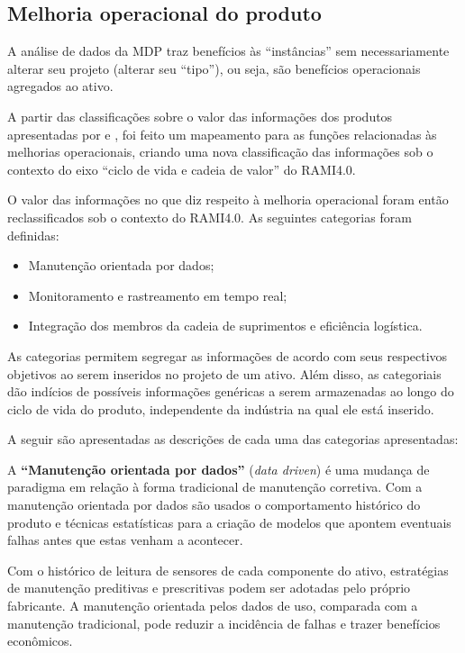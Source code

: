 \subsection{Melhoria operacional do produto}
\label{sec:melhoria-operacional}

A análise de dados da MDP traz benefícios às ``instâncias'' sem necessariamente alterar seu projeto (alterar seu ``tipo''), ou seja, são benefícios operacionais agregados ao ativo.

A partir das classificações sobre o valor das informações dos produtos apresentadas por  e , foi feito um mapeamento para as funções relacionadas às melhorias operacionais, criando uma nova classificação das informações sob o contexto do eixo ``ciclo de vida e cadeia de valor'' do RAMI4.0.

O valor das informações no que diz respeito à melhoria operacional foram então reclassificados sob o contexto do RAMI4.0. As seguintes categorias foram definidas:

\begin{itemize}
	\item Manutenção orientada por dados;
	\item Monitoramento e rastreamento em tempo real;
	\item Integração dos membros da cadeia de suprimentos e eficiência logística.
\end{itemize}

As categorias permitem segregar as informações de acordo com seus respectivos objetivos ao serem inseridos no projeto de um ativo. Além disso, as categoriais dão indícios de possíveis informações genéricas a serem armazenadas ao longo do ciclo de vida do produto, independente da indústria na qual ele está inserido.

A seguir são apresentadas as descrições de cada uma das categorias apresentadas:

A \textbf{``Manutenção orientada por dados''} (\textit{data driven}) é uma mudança de paradigma em relação à forma tradicional de manutenção corretiva. Com a manutenção orientada por dados são usados o comportamento histórico do produto e técnicas estatísticas para a criação de modelos que apontem eventuais falhas antes que estas venham a acontecer.

Com o histórico de leitura de sensores de cada componente do ativo, estratégias de manutenção preditivas e prescritivas podem ser adotadas pelo próprio fabricante. A manutenção orientada pelos dados de uso, comparada com a manutenção tradicional, pode reduzir a incidência de falhas e trazer benefícios econômicos. %

